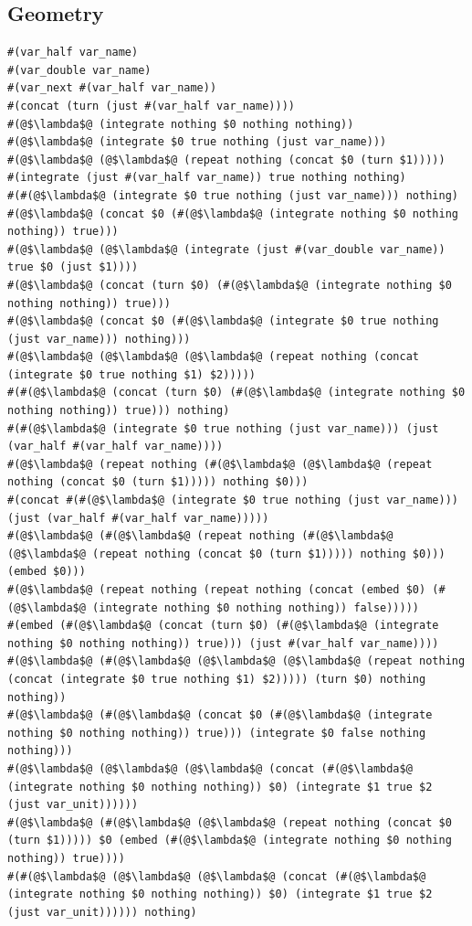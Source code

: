 \documentclass{article}
\begin{document}
\subsection{Geometry}
\begin{lstlisting}
#(var_half var_name)
#(var_double var_name)
#(var_next #(var_half var_name))
#(concat (turn (just #(var_half var_name))))
#(@$\lambda$@ (integrate nothing $0 nothing nothing))
#(@$\lambda$@ (integrate $0 true nothing (just var_name)))
#(@$\lambda$@ (@$\lambda$@ (repeat nothing (concat $0 (turn $1)))))
#(integrate (just #(var_half var_name)) true nothing nothing)
#(#(@$\lambda$@ (integrate $0 true nothing (just var_name))) nothing)
#(@$\lambda$@ (concat $0 (#(@$\lambda$@ (integrate nothing $0 nothing nothing)) true)))
#(@$\lambda$@ (@$\lambda$@ (integrate (just #(var_double var_name)) true $0 (just $1))))
#(@$\lambda$@ (concat (turn $0) (#(@$\lambda$@ (integrate nothing $0 nothing nothing)) true)))
#(@$\lambda$@ (concat $0 (#(@$\lambda$@ (integrate $0 true nothing (just var_name))) nothing)))
#(@$\lambda$@ (@$\lambda$@ (@$\lambda$@ (repeat nothing (concat (integrate $0 true nothing $1) $2)))))
#(#(@$\lambda$@ (concat (turn $0) (#(@$\lambda$@ (integrate nothing $0 nothing nothing)) true))) nothing)
#(#(@$\lambda$@ (integrate $0 true nothing (just var_name))) (just (var_half #(var_half var_name))))
#(@$\lambda$@ (repeat nothing (#(@$\lambda$@ (@$\lambda$@ (repeat nothing (concat $0 (turn $1))))) nothing $0)))
#(concat #(#(@$\lambda$@ (integrate $0 true nothing (just var_name))) (just (var_half #(var_half var_name)))))
#(@$\lambda$@ (#(@$\lambda$@ (repeat nothing (#(@$\lambda$@ (@$\lambda$@ (repeat nothing (concat $0 (turn $1))))) nothing $0))) (embed $0)))
#(@$\lambda$@ (repeat nothing (repeat nothing (concat (embed $0) (#(@$\lambda$@ (integrate nothing $0 nothing nothing)) false)))))
#(embed (#(@$\lambda$@ (concat (turn $0) (#(@$\lambda$@ (integrate nothing $0 nothing nothing)) true))) (just #(var_half var_name))))
#(@$\lambda$@ (#(@$\lambda$@ (@$\lambda$@ (@$\lambda$@ (repeat nothing (concat (integrate $0 true nothing $1) $2))))) (turn $0) nothing nothing))
#(@$\lambda$@ (#(@$\lambda$@ (concat $0 (#(@$\lambda$@ (integrate nothing $0 nothing nothing)) true))) (integrate $0 false nothing nothing)))
#(@$\lambda$@ (@$\lambda$@ (@$\lambda$@ (concat (#(@$\lambda$@ (integrate nothing $0 nothing nothing)) $0) (integrate $1 true $2 (just var_unit))))))
#(@$\lambda$@ (#(@$\lambda$@ (@$\lambda$@ (repeat nothing (concat $0 (turn $1))))) $0 (embed (#(@$\lambda$@ (integrate nothing $0 nothing nothing)) true))))
#(#(@$\lambda$@ (@$\lambda$@ (@$\lambda$@ (concat (#(@$\lambda$@ (integrate nothing $0 nothing nothing)) $0) (integrate $1 true $2 (just var_unit)))))) nothing)

\end{lstlisting}
\end{document}
